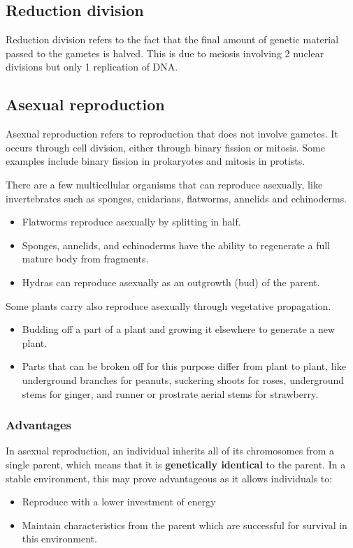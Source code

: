 \documentclass[11pt]{article}
\begin{document}
\subsection{Reduction division}
\label{sec:orgf0887db}
Reduction division refers to the fact that the final amount of genetic material passed to the gametes is halved. This is due to meiosis involving 2 nuclear divisions but only 1 replication of DNA.
\subsection{Asexual reproduction}
\label{sec:org393bbee}
Asexual reproduction refers to reproduction that does not involve gametes. It occurs through cell division, either through binary fission or mitosis. Some examples include binary fission in prokaryotes and mitosis in protists.


There are a few multicellular organisms that can reproduce asexually, like invertebrates such as sponges, cnidarians, flatworms, annelids and echinoderms.
\begin{itemize}
\item Flatworms reproduce asexually by splitting in half.
\item Sponges, annelids, and echinoderms have the ability to regenerate a full mature body from fragments.
\item Hydras can reproduce asexually as an outgrowth (bud) of the parent.
\end{itemize}

Some plants carry also reproduce asexually through vegetative propagation.
\begin{itemize}
\item Budding off a part of a plant and growing it elsewhere to generate a new plant.
\item Parts that can be broken off for this purpose differ from plant to plant, like underground branches for peanuts, suckering shoots for roses, underground stems for ginger, and runner or prostrate aerial stems for strawberry.
\end{itemize}
\subsubsection{Advantages}
\label{sec:org997e9f9}
In asexual reproduction, an individual inherits all of its chromosomes from a single parent, which means that it is \textbf{genetically identical} to the parent. In a stable environment, this may prove advantageous as it allows individuals to:
\begin{itemize}
\item Reproduce with a lower investment of energy
\item Maintain characteristics from the parent which are successful for survival in this environment.
\end{itemize}
\end{document}
